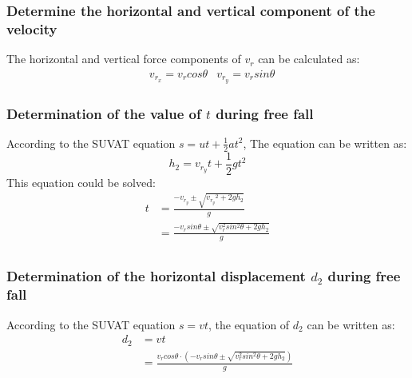 \documentclass[conference]{IEEEtran}
\begin{document}
        \subsubsection{Determine the horizontal and vertical component of the velocity}
            The horizontal and vertical force components of $v_r$ can be calculated as:
            \begin{equation}
                \begin{aligned}
                &v_{r_x} = v_rcos\theta  &v_{r_y} = v_rsin\theta
                \end{aligned}
            \end{equation}
        \subsubsection{Determination of the value of $t$ during free fall}
            According to the SUVAT equation $s = ut +\frac{1}{2}at^2$, The equation can be written as:
            \begin{equation}
                h_2 = v_{r_y}t + \frac{1}{2}gt^2 \nonumber
            \end{equation}
            This equation could be solved:
            \begin{equation}
                \begin{aligned}
                    t &= \frac{-v_{r_y}\pm\sqrt{{v_{r_y}}^2+2gh_2}}{g}\\
                      &= \frac{-v_{r}sin\theta\pm\sqrt{{v^2_{r}sin^2\theta}+2gh_2}}{g}\\
                \end{aligned}
            \end{equation}
        \subsubsection{Determination of the horizontal displacement $d_2$ during free fall }
            According to the SUVAT equation $s = vt$, the equation of $d_2$ can be written as:
                \begin{equation}
                    \begin{aligned}
                        d_2 &= vt
                        \\ &= \frac{v_rcos\theta \cdot (-v_{r}sin\theta\pm\sqrt{{v^2_{r}sin^2\theta}+2gh_2})}{g}
                    \end{aligned}
                \end{equation}
\end{document}
